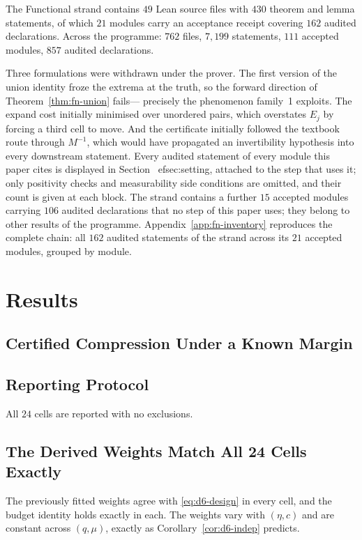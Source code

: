 The Functional strand contains $49$ Lean source files with $430$ theorem and lemma
statements, of which $21$ modules carry an acceptance receipt covering $162$ audited
declarations. Across the programme: $762$ files, $7{,}199$ statements, $111$ accepted modules,
$857$ audited declarations.

Three formulations were withdrawn under the prover. The first version of the union identity
froze the extrema at the truth, so the forward direction of Theorem~\ref{thm:fn-union} fails---
precisely the phenomenon family~1 exploits. The expand cost initially minimised over unordered
pairs, which overstates $E_{j}$ by forcing a third cell to move. And the certificate initially
followed the textbook route through $M^{-1}$, which would have propagated an invertibility
hypothesis into every downstream statement. Every audited statement of every module this paper cites is displayed in Section~
ef{sec:setting}, attached to the step that uses it; only positivity checks and measurability side conditions are omitted, and their count is given at each block. The strand contains a further $15$ accepted modules carrying $106$ audited declarations that no step of this paper uses; they belong to other results of the programme. Appendix~\ref{app:fn-inventory} reproduces the complete chain: all $162$ audited statements of the strand across its $21$ accepted modules, grouped by module.


\section{Results}

\subsection{Certified Compression Under a Known Margin}
\label{sec:d6-results}

\subsection{Reporting Protocol}

All $24$ cells are reported with no exclusions.

\subsection{The Derived Weights Match All 24 Cells Exactly}

The previously fitted weights agree with \eqref{eq:d6-design} in every cell, and the budget
identity holds exactly in each. The weights vary with $(\eta,c)$ and are constant across
$(q,\mu)$, exactly as Corollary~\ref{cor:d6-indep} predicts.


